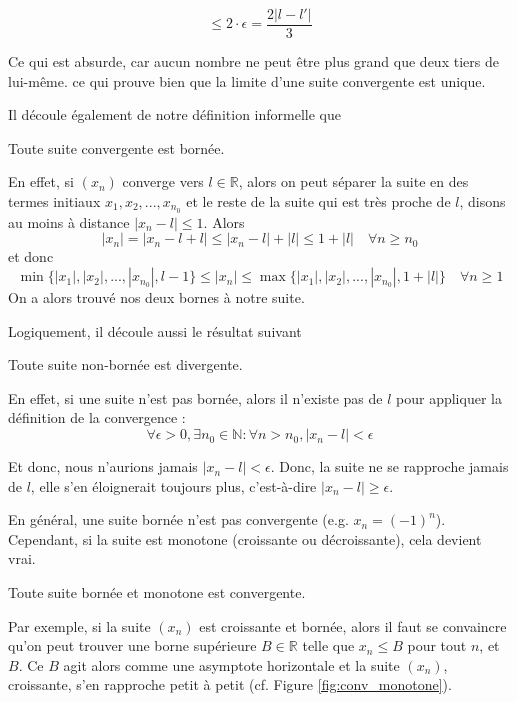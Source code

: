 $$\leq 2\cdot\epsilon = \frac{2\lvert l-l' \rvert}{3}$$

Ce qui est absurde, car aucun nombre ne peut être plus grand que deux tiers de lui-même. ce qui prouve bien que la limite d'une suite convergente est unique.











Il découle également de notre définition informelle que 
\begin{boxthm}
Toute suite convergente est bornée.
\end{boxthm}

En effet, si $(x_n)$ converge vers $l \in \mathbb R$, alors on peut séparer la suite en des termes initiaux $x_1,x_2,...,x_{n_0}$ et le reste de la suite qui est très proche de $l$, disons au moins à distance $|x_n - l| \leq 1$. Alors
$$|x_n| = |x_n - l + l| \leq |x_n - l| + |l| \leq 1 + |l| \quad \forall n \geq n_0$$ et donc
$$\min\{|x_1|, |x_2|, ..., |x_{n_0}|, l - 1\} \leq |x_n| \leq \max\{|x_1|, |x_2|, ..., |x_{n_0}|, 1 + |l|\} \quad \forall n \geq 1$$
On a alors trouvé nos deux bornes à notre suite.

Logiquement, il découle aussi le résultat suivant

\begin{boxthm}
Toute suite non-bornée est divergente.
\end{boxthm}
En effet, si une suite n'est pas bornée, alors il n'existe pas de $l$ pour appliquer la définition de la convergence :
$$\forall \epsilon > 0 , \exists n_0 \in \mathbb{N} : \forall n > n_0, \lvert x_n - l \rvert < \epsilon$$

Et donc, nous n'aurions jamais $ \lvert x_n - l \rvert < \epsilon$. Donc, la suite ne se rapproche jamais de $l$, elle s'en éloignerait toujours plus, c'est-à-dire $ \lvert x_n - l \rvert \geq \epsilon$.


En général, une suite bornée n'est pas convergente (e.g. $x_n = (-1)^n$). Cependant, si la suite est monotone (croissante ou décroissante), cela devient vrai.
\begin{boxthm}
Toute suite bornée et monotone est convergente.
\label{thm:conv_monotone}
\end{boxthm}
Par exemple, si la suite $(x_n)$ est croissante et bornée, alors il faut se convaincre qu'on peut trouver une borne supérieure $B \in \mathbb{R}$ telle que $x_n \leq B$ pour tout $n$, et $B$. Ce $B$ agit alors comme une asymptote horizontale et la suite $(x_n)$, croissante, s'en rapproche petit à petit (cf. Figure \ref{fig:conv_monotone}).

